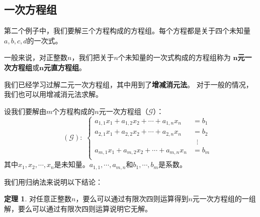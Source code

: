 \documentclass[12pt,UTF8]{ctexbook}
\theoremstyle{definition}
\newtheorem{tm}{定理}[section]
\theoremstyle{plain}
\begin{document}
\subsection{一次方程组}

第二个例子中，我们要解三个方程构成的方程组。每个方程都是关于四个未知量$a,b,c,d$的一次式。

一般来说，对正整数$n$，我们把关于$n$个未知量的一次式构成的方程组称为
$\boldsymbol{n}$\textbf{元一次方程组}或$\boldsymbol{n}$\textbf{元直方程组}。

我们已经学习过解二元一次方程组，其中用到了\textbf{增减消元法}。
对于一般的情况，我们也可以用增减消元法求解。

设我们要解由$m$个方程构成的$n$元一次方程组（$\mathcal{G}$）：
$$
\qquad (\mathcal{G}):\,\,
\left\{
    \begin{aligned}
        a_{1,1} x_1 + a_{1,2} x_2 + \cdots + a_{1,n} x_n &= b_1 \\
        a_{2,1} x_1 + a_{2,2} x_2 + \cdots + a_{2,n} x_n &= b_2 \\
        &\;\;\vdots \\
        a_{m,1} x_1 + a_{m,2} x_2 + \cdots + a_{m,n} x_n &= b_m \\
    \end{aligned}
\right.
$$
其中$x_1, x_2, \cdots , x_n$是未知量。$a_{1,1}, \cdots , a_{m,n}$和$b_1, \cdots , b_m$是系数。

我们用归纳法来说明以下结论：
\begin{tm}
    对任意正整数$n$，要么可以通过有限次四则运算得到$n$元一次方程组的一组解，要么可以通过有限次四则运算说明它无解。
\end{tm}
\end{document}
